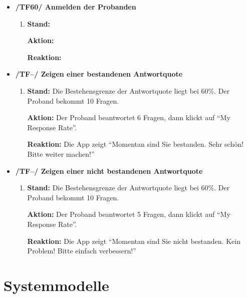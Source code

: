 \documentclass[a4paper]{scrreprt}
\begin{document}
            \begin{itemize}

            \item \textbf{/TF60/ Anmelden der Probanden}
            \begin{enumerate}
                \item \par \textbf{Stand: } 
                \par \textbf{Aktion: }
                \par \textbf{Reaktion: }
            \end{enumerate}
            
            \item \textbf{/TF--/ Zeigen einer bestandenen Antwortquote}
            \begin{enumerate}
                \item \par \textbf{Stand: }Die Bestehensgrenze der Antwortquote liegt bei 60\%. Der Proband bekommt 10 Fragen.
                \par \textbf{Aktion: }Der Proband beantwortet 6 Fragen, dann klickt auf “My Response Rate”.
                \par \textbf{Reaktion: }Die App zeigt “Momentan sind Sie bestanden. Sehr schön! Bitte weiter machen!”
            \end{enumerate}
            
            \item \textbf{/TF--/ Zeigen einer nicht bestandenen Antwortquote}
            \begin{enumerate}
                \item \par \textbf{Stand: }Die Bestehensgrenze der Antwortquote liegt bei 60\%. Der Proband bekommt 10 Fragen.
                \par \textbf{Aktion: }Der Proband beantwortet 5 Fragen, dann klickt auf “My Response Rate”.
                \par \textbf{Reaktion: }Die App zeigt “Momentan sind Sie nicht bestanden. Kein Problem! Bitte einfach verbessern!”
            \end{enumerate}
        
            \end{itemize}

    \chapter{Systemmodelle}
\end{document}
